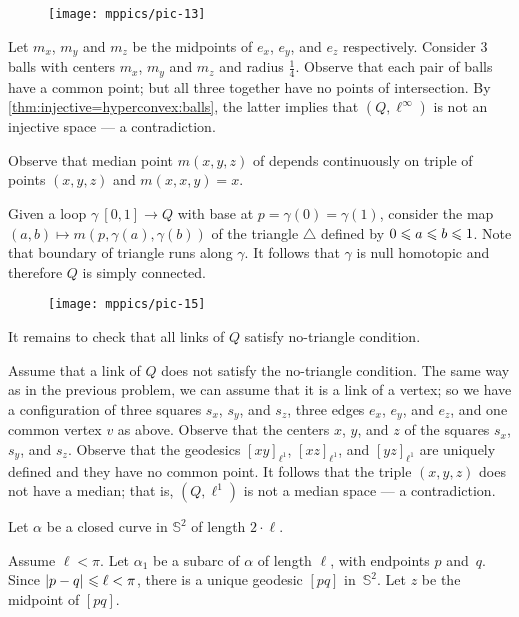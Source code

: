 \begin{wrapfigure}{r}{25 mm}
\vskip-4mm
\centering
\texttt{[image: mppics/pic-13]}
\end{wrapfigure}

Let $m_x$, $m_y$ and $m_z$ be the midpoints of $e_x$, $e_y$, and $e_z$ respectively.
Consider 3 balls with centers $m_x$, $m_y$ and $m_z$ and radius $\tfrac14$.
Observe that each pair of balls have a common point;
but all three together have no points of intersection.
By \ref{thm:injective=hyperconvex:balls}, the latter implies that $(Q,\ell^\infty)$ is not an injective space --- a contradiction.


Observe that median point $m(x,y,z)$ of depends continuously on triple of points $(x,y,z)$ and $m(x,x,y)=x$.

Given a loop $\gamma\:[0,1]\to Q$ with base at $p=\gamma(0)=\gamma(1)$,
consider the map $(a,b)\mapsto m(p,\gamma(a),\gamma(b))$ of the triangle $\triangle$ defined by $0\z\le a \z\le b\z\le 1$.
Note that boundary of triangle runs along $\gamma$.
It follows that $\gamma$ is null homotopic and therefore $Q$ is simply connected.

\begin{wrapfigure}{r}{25 mm}
\vskip-4mm
\centering
\texttt{[image: mppics/pic-15]}
\end{wrapfigure}

It remains to check that all links of $Q$ satisfy no-triangle condition.

Assume that a link of $Q$ does not satisfy the no-triangle condition.
The same way as in the previous problem, we can assume that it is a link of a vertex;
so we have a configuration of three squares $s_x$, $s_y$, and $s_z$, 
three edges $e_x$, $e_y$, and $e_z$, and one common vertex $v$ as above.
Observe that the centers $x$, $y$, and $z$ of the squares $s_x$, $s_y$, and $s_z$.
Observe that the geodesics $[xy]_{\ell^1}$, $[xz]_{\ell^1}$, and $[yz]_{\ell^1}$ are uniquely defined and they have no common point.
It follows that the triple $(x,y,z)$ does not have a median; 
that is, $(Q,\ell^1)$ is not a median space --- a contradiction.


Let $\alpha$ be a closed curve in $\mathbb{S}^2$ of length $2\cdot\ell$.

Assume $\ell<\pi$.
Let $\alpha_1$ be a subarc of $\alpha$ of length $\ell$, with endpoints $p$ and~$q$. 
Since $\dist{p}{q}{}\le\ell<\pi$, there is a unique geodesic $[pq]$ in~$\mathbb{S}^2$.  
Let $z$ be the midpoint of $[pq]$. 

